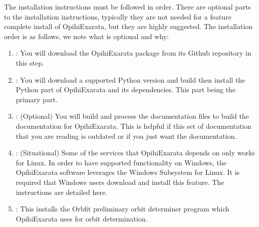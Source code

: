 \documentclass[letterpaper,11pt,english]{sphinxmanual}
\begin{document}
\sphinxAtStartPar
The installation instructions must be followed in order. There are optional
parts to the installation instructions, typically they are not needed for a
feature complete install of OpihiExarata, but they are highly suggested. The
installation order is as follows, we note what is optional and why:
\begin{enumerate}
%
\item {} 
\sphinxAtStartPar
{\hyperref[\detokenize{technical/installation/download:technical-installation-download}]{}}: You will download the OpihiExarata package from its Github repository in this step.

\item {} 
\sphinxAtStartPar
{\hyperref[\detokenize{technical/installation/python:technical-installation-python-part}]{}}: You will download a supported Python version and build then install the Python part of OpihiExarata and its dependencies. This part being the primary part.

\item {} 
\sphinxAtStartPar
{\hyperref[\detokenize{technical/installation/documentation:technical-installation-documentation}]{}}: (Optional) You will build and process the documentation files to build the documentation for OpihiExarata. This is helpful if this set of documentation that you are reading is outdated or if you just want the documentation.

\item {} 
\sphinxAtStartPar
{\hyperref[\detokenize{technical/installation/windows:technical-installation-windows-compatibility}]{}}: (Situational) Some of the services that OpihiExarata depends on only works for Linux. In order to have supported functionality on Windows, the OpihiExarata software leverages the Windows Subsystem for Linux. It is required that Windows users download and install this feature. The instructions are detailed here.

\item {} 
\sphinxAtStartPar
{\hyperref[\detokenize{technical/installation/orbfit:technical-installation-orbfit}]{}}: This installs the Orbfit preliminary orbit determiner program which OpihiExarata uses for orbit determination.

\end{enumerate}
\end{document}
